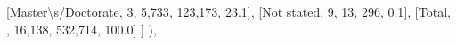 \documentclass[
  11pt,
  a4paper,
]{article}
\newenvironment{Shaded}{\begin{snugshade}}{\end{snugshade}}
\newcommand{\CharTok}[1]{\textcolor[rgb]{0.13,0.47,0.30}{#1}}
\newcommand{\NormalTok}[1]{\textcolor[rgb]{0.00,0.23,0.31}{#1}}
\newcommand{\StringTok}[1]{\textcolor[rgb]{0.13,0.47,0.30}{#1}}
\begin{document}
\begin{Shaded}
\begin{Highlighting}[]
\NormalTok{                [}\StringTok{\textquotesingle{}Master}\CharTok{\textbackslash{}\textquotesingle{}}\StringTok{s/Doctorate\textquotesingle{}}\NormalTok{, }\StringTok{\textquotesingle{}3\textquotesingle{}}\NormalTok{, }\StringTok{\textquotesingle{}5,733\textquotesingle{}}\NormalTok{, }\StringTok{\textquotesingle{}123,173\textquotesingle{}}\NormalTok{, }\StringTok{\textquotesingle{}23.1\textquotesingle{}}\NormalTok{],}
\NormalTok{                [}\StringTok{\textquotesingle{}Not stated\textquotesingle{}}\NormalTok{, }\StringTok{\textquotesingle{}9\textquotesingle{}}\NormalTok{, }\StringTok{\textquotesingle{}13\textquotesingle{}}\NormalTok{, }\StringTok{\textquotesingle{}296\textquotesingle{}}\NormalTok{, }\StringTok{\textquotesingle{}0.1\textquotesingle{}}\NormalTok{],}
\NormalTok{                [}\StringTok{\textquotesingle{}Total\textquotesingle{}}\NormalTok{, }\StringTok{\textquotesingle{}\textquotesingle{}}\NormalTok{, }\StringTok{\textquotesingle{}16,138\textquotesingle{}}\NormalTok{, }\StringTok{\textquotesingle{}532,714\textquotesingle{}}\NormalTok{, }\StringTok{\textquotesingle{}100.0\textquotesingle{}}\NormalTok{]}
\NormalTok{                ]}
\NormalTok{            ),}
        

\end{Highlighting}
\end{Shaded}
\end{document}
